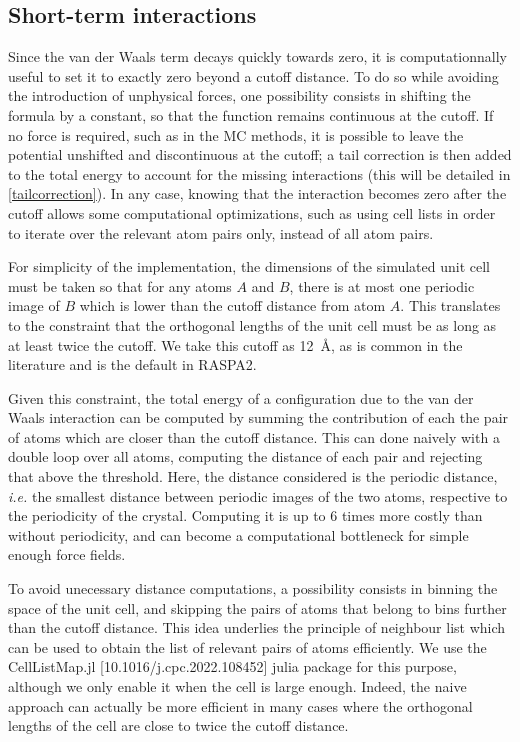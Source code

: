 \documentclass[main.tex]{subfiles}
\begin{document}
\subsection{Short-term interactions}

Since the van der Waals term decays quickly towards zero, it is computationnally useful to set it to exactly zero beyond a cutoff distance. To do so while avoiding the introduction of unphysical forces, one possibility consists in shifting the formula by a constant, so that the function remains continuous at the cutoff. If no force is required, such as in the MC methods, it is possible to leave the potential unshifted and discontinuous at the cutoff; a tail correction is then added to the total energy to account for the missing interactions (this will be detailed in \cref{tailcorrection}). In any case, knowing that the interaction becomes zero after the cutoff allows some computational optimizations, such as using cell lists in order to iterate over the relevant atom pairs only, instead of all atom pairs.

For simplicity of the implementation, the dimensions of the simulated unit cell must be taken so that for any atoms $A$ and $B$, there is at most one periodic image of $B$ which is lower than the cutoff distance from atom $A$. This translates to the constraint that the orthogonal lengths of the unit cell must be as long as at least twice the cutoff. We take this cutoff as \qty{12}{\angstrom}, as is common in the literature and is the default in RASPA2.

Given this constraint, the total energy of a configuration due to the van der Waals interaction can be computed by summing the contribution of each the pair of atoms which are closer than the cutoff distance. This can done naively with a double loop over all atoms, computing the distance of each pair and rejecting that above the threshold. Here, the distance considered is the periodic distance, \textit{i.e.} the smallest distance between periodic images of the two atoms, respective to the periodicity of the crystal. Computing it is up to 6 times more costly than without periodicity, and can become a computational bottleneck for simple enough force fields.

To avoid unecessary distance computations, a possibility consists in binning the space of the unit cell, and skipping the pairs of atoms that belong to bins further than the cutoff distance. This idea underlies the principle of neighbour list which can be used to obtain the list of relevant pairs of atoms efficiently. We use the CellListMap.jl [10.1016/j.cpc.2022.108452] julia package for this purpose, although we only enable it when the cell is large enough. Indeed, the naive approach can actually be more efficient in many cases where the orthogonal lengths of the cell are close to twice the cutoff distance.
\end{document}
